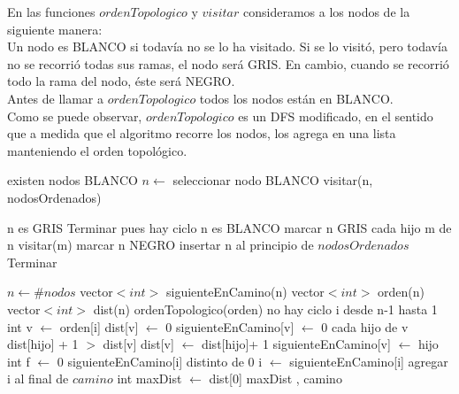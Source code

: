 \indent En las funciones $ordenTopologico$ y $visitar$ consideramos a los nodos de la siguiente manera:\\
\indent Un nodo es BLANCO si todavía no se lo ha visitado. Si se lo visitó, pero todavía no se recorrió todas sus ramas, el nodo será GRIS. En cambio, cuando se recorrió todo la rama del nodo, éste será NEGRO.\\
\indent Antes de llamar a $ordenTopologico$ todos los nodos están en BLANCO. \\
\indent Como se puede observar, $ordenTopologico$ es un DFS modificado, en el sentido que a medida que el algoritmo recorre los nodos, los agrega en una lista manteniendo el orden topológico.\\


\begin{algorithm}[H]
\caption{} 
\begin{codebox}
\li \While existen nodos BLANCO \Do
\li	$n \gets$ seleccionar nodo BLANCO
\li	visitar(n, nodosOrdenados)

\End
\end{codebox}
\end{algorithm}


\begin{algorithm}[H]
\caption{} 
\begin{codebox}
\li \If n es GRIS \Do
\li 	 Terminar pues hay ciclo
\li \End
\li \If n es BLANCO \Do
\li 	marcar n GRIS
\li		\For cada hijo m de n \Do
\li			visitar(m)			
\li		\End
\li		marcar n NEGRO
\li 		insertar n al principio de $nodosOrdenados$
\li 		Terminar
\li \End

\End
\end{codebox}
\end{algorithm}
 


\begin{algorithm}[H]
\caption{} 
\begin{codebox}
\li $n \gets \# nodos $
\li vector$<int>$ siguienteEnCamino(n)
\li vector$<int>$ orden(n)
\li vector$<int>$ dist(n)
\li ordenTopologico(orden)
\li \If no hay ciclo \Do
\li 	\For i desde n-1 hasta 1 \Do
\li		int v $\gets$ orden[i]
\li		dist[v] $\gets$ 0
\li 		siguienteEnCamino[v] $\gets$ 0
\li		\For cada hijo de v \Do
\li		  	\If dist[hijo] + 1 $>$ dist[v] \Do
\li				dist[v] $\gets$ dist[hijo]+ 1
\li				siguienteEnCamino[v] $\gets$ hijo
\li			\End
\li		\End
\li	\End
\li	int f $\gets$ 0
\li	\While siguienteEnCamino[i] distinto de 0 \Do
\li		i $\gets$ siguienteEnCamino[i]
\li		agregar i al final de $camino$
\li	\End
\li 	int maxDist $\gets$ dist[0]
\li 	\Return maxDist , camino	
\li \End
\li \Else \Do
\li {}
\End

\end{codebox}
\end{algorithm}

